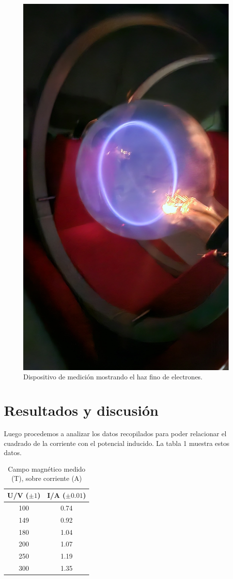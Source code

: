 \documentclass[twocolumn,a4paper,11pt]{scrartcl}
\begin{document}
\begin{figure}[h]
    \centering
    \includegraphics[width=0.8\linewidth]{haz_fino_funcionando.jpg}
    \caption{Dispositivo de medición mostrando el haz fino de electrones.}
    \label{fig:measurement_device}
\end{figure}

\section{Resultados y discusión}

Luego procedemos a analizar los datos recopilados para poder relacionar el cuadrado de la corriente con el potencial inducido. La tabla 1 muestra estos datos.

\begin{table}[h!]
\begin{tabular}{ |c| c | } 
\hline
U/V ($\pm 1$) & I/A ($\pm 0.01$) \\ 
\hline
100 & 0.74 \\ 
149 & 0.92 \\ 
180 & 1.04 \\ 
200 & 1.07 \\ 
250 & 1.19 \\ 
300 & 1.35 \\ 
\hline
\end{tabular}
\caption{Campo magnético medido (T), sobre corriente (A)}
\label{tabla:mediciones}
\end{table}
\end{document}
